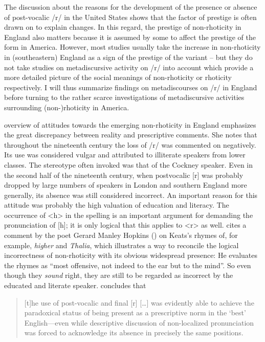 The discussion about the reasons for the development of the presence or absence of post-vocalic /r/ in the United States shows that the factor of prestige is often drawn on to explain changes. In this regard, the prestige of non-rhoticity in England also matters because it is assumed by some to affect the prestige of the form in America. However, most studies usually take the increase in non-rhoticity in (southeastern) England as a sign of the prestige of the variant – but they do not take studies on metadiscursive activity on /r/ into account which provide a more detailed picture of the social meanings of non-rhoticity or rhoticity respectively. I will thus summarize findings on metadiscourses on /r/ in England before turning to the rather scarce investigations of metadiscursive activities surrounding (non-)rhoticity in America. {}

 overview of attitudes towards the emerging non-rhoticity in England emphasizes the great discrepancy between reality and prescriptive comments. She notes that throughout the nineteenth century the loss of /r/ was commented on negatively. Its use was considered vulgar and attributed to illiterate speakers from lower classes. The stereotype often invoked was that of the Cockney speaker. Even in the second half of the nineteenth century, when postvocalic [r] was probably dropped by large numbers of speakers in London and southern England more generally, its absence was still considered incorrect. An important reason for this attitude was probably the high valuation of education and literacy. The occurrence of <h> in the spelling is an important argument for demanding the pronunciation of [h]; it is only logical that this applies to <r> as well. \citet[88]{Mugglestone2003} cites a comment by the poet Gerard Manley Hopkins (\citeyear{Hopkins22December1880}) on Keats’s rhymes of, for example, \emph{higher} and \emph{Thalia}, which illustrates a way to reconcile the logical incorrectness of non-rhoticity with its obvious widespread presence: He evaluates the rhymes as “most offensive, not indeed to the ear but to the mind”. So even though they \emph{sound} right, they are still to be regarded as incorrect by the educated and literate speaker. \citet[90]{Mugglestone2003} concludes that

\begin{quote}
[t]he use of post-vocalic and final [r] […] was evidently able to achieve the paradoxical status of being present as a prescriptive norm in the ‘best’ English—even while descriptive discussion of non-localized pronunciation was forced to acknowledge its absence in precisely the same positions.
\end{quote}

